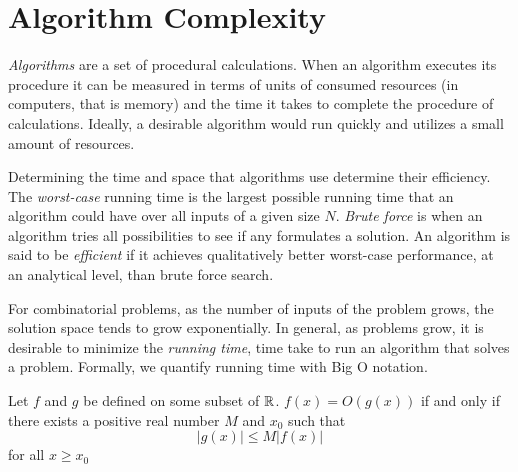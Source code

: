 \section{Algorithm Complexity}
\textit{Algorithms} are a set of procedural calculations.  When an algorithm executes its procedure it can be measured in terms of units of consumed resources (in computers, that is memory) and the time it takes to complete the procedure of calculations.  Ideally, a desirable algorithm would run quickly and utilizes a small amount of resources.

Determining the time and space that algorithms use determine their efficiency.  The \textit{worst-case} running time is the largest possible running time that an algorithm could have over all inputs of a given size $N$.  \textit{Brute force} is when an algorithm tries all possibilities to see if any formulates a solution.  An algorithm is said to be \textit{efficient} if it achieves qualitatively better worst-case performance, at an analytical level, than brute force search.%

For combinatorial problems, as the number of inputs of the problem grows, the solution space tends to grow exponentially.  In general, as problems grow, it is desirable to minimize the \textit{running time}, time take to run an algorithm that solves a problem. Formally, we quantify running time with Big O notation.
\begin{definition}
Let $f$ and $g$ be defined on some subset of ${\mathbb{R}}$.  $f(x) = O\left(g(x)\right)$ if and only if there exists a positive real number $M$ and $x_0$ such that $$\left\vert g(x)\right\vert \leq M \left\vert f(x) \right\vert$$
for all $x \geq x_0$
\end{definition}



